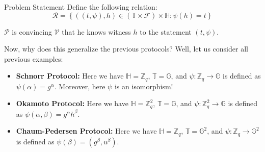 \documentclass{zkdl-presentation-template}
\begin{document}
    \begin{frame}{Problem Statement}
        Define the following relation:
        \begin{equation*}
            \mathcal{R} = \left\{ ((t,\psi), h) \in (\mathbb{T} \times \mathcal{F}) \times \mathbb{H}: \psi(h) = t \right\}
        \end{equation*}
        \vspace{-25pt}

        $\mathcal{P}$ is convincing $\mathcal{V}$ that he knows witness $h$ to the statement $(t,\psi)$. 
        \begin{example}
            Now, why does this generalize the previous protocols? Well, let us consider all previous examples:
            \begin{itemize}
                \item \textbf{Schnorr Protocol:} Here we have $\mathbb{H} = \mathbb{Z}_q$, $\mathbb{T} = \mathbb{G}$, and $\psi: \mathbb{Z}_q \to \mathbb{G}$ is defined as $\psi(\alpha) = g^{\alpha}$. Moreover, here $\psi$ is an isomorphism!
                \item \textbf{Okamoto Protocol:} Here we have $\mathbb{H} = \mathbb{Z}_q^2$, $\mathbb{T} = \mathbb{G}$, and $\psi: \mathbb{Z}_q^2 \to \mathbb{G}$ is defined as $\psi(\alpha,\beta) = g^{\alpha}h^{\beta}$.
                \item \textbf{Chaum-Pedersen Protocol:} Here we have $\mathbb{H} = \mathbb{Z}_q$, $\mathbb{T} = \mathbb{G}^2$, and $\psi: \mathbb{Z}_q \to \mathbb{G}^2$ is defined as $\psi(\beta) = (g^{\beta},u^{\beta})$. 
            \end{itemize}
        \end{example}
    \end{frame}
\end{document}
